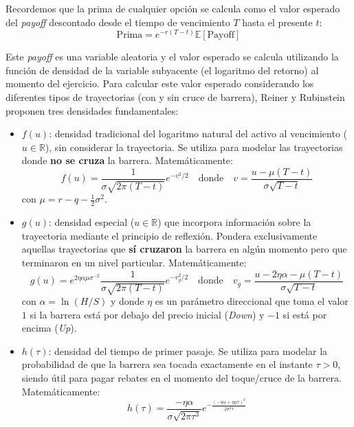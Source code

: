Recordemos que la prima de cualquier opción se calcula como el valor esperado del \textit{payoff} descontado desde el tiempo de vencimiento $T$ hasta el presente $t$:
\begin{equation}
\text{Prima} = e^{-r(T-t)} \mathbb{E}[\text{Payoff}]
\end{equation}

Este \textit{payoff} es una variable aleatoria y el valor esperado se calcula utilizando la función de densidad de la variable subyacente (el logaritmo del retorno) al momento del ejercicio. Para calcular este valor esperado considerando los diferentes tipos de trayectorias (con y sin cruce de barrera), Reiner y Rubinstein proponen tres densidades fundamentales:

\begin{itemize}
    \item $f(u)$: densidad tradicional del logaritmo natural del activo al vencimiento ($u \in \mathbb{R}$), sin considerar la trayectoria. Se utiliza para modelar las trayectorias donde \textbf{no se cruza} la barrera. Matemáticamente:
    \begin{equation*}
        f(u)=\frac{1}{\sigma \sqrt{2\pi (T-t)}} e^{-v^2/2} \quad \text{donde} \quad v=\frac{u-\mu (T-t)}{\sigma \sqrt{T-t}}
    \end{equation*}
    con $\mu=r - q - \frac{1}{2}\sigma^2$.
    \item $g(u)$: densidad especial ($u \in \mathbb{R}$) que incorpora información sobre la trayectoria mediante el principio de reflexión. Pondera exclusivamente aquellas trayectorias que \textbf{sí cruzaron} la barrera en algún momento pero que terminaron en un nivel particular. Matemáticamente:
    \begin{equation*}
        g(u)=e^{2\eta\alpha \mu \sigma^{-2}} \frac{1}{\sigma \sqrt{2\pi (T-t)}} e^{-v_g^2/2} \quad \text{donde} \quad v_g=\frac{u - 2\eta\alpha - \mu (T-t)}{\sigma \sqrt{T-t}}
    \end{equation*}
    con $\alpha=\ln(H/S)$ y donde $\eta$ es un parámetro direccional que toma el valor $1$ si la barrera está por debajo del precio inicial (\textit{Down}) y $-1$ si está por encima (\textit{Up}).
    \item $h(\tau)$: densidad del tiempo de primer pasaje. Se utiliza para modelar la probabilidad de que la barrera sea tocada exactamente en el instante $\tau > 0$, siendo útil para pagar rebates en el momento del toque/cruce de la barrera. Matemáticamente:
    \begin{equation*}
        h(\tau) = \frac{-\eta \alpha}{\sigma \sqrt{2\pi \tau^3}} e^{-\frac{(-\eta\alpha + \eta\mu \tau)^2}{2\sigma^2 \tau}}
    \end{equation*}
\end{itemize}

